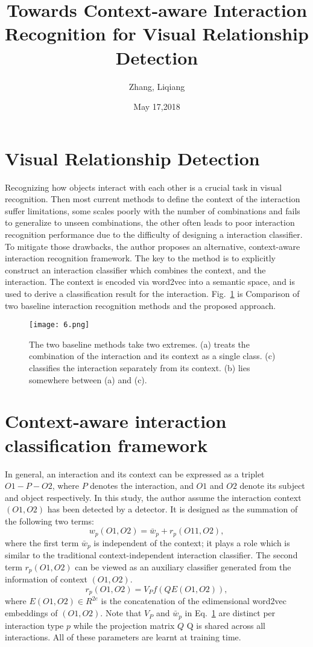 \documentclass{article}
\author{Zhang, Liqiang}
\date{May 17,2018}
\title{Towards Context-aware Interaction Recognition for Visual Relationship Detection}
\begin{document}
\maketitle
\par
\section{Visual Relationship Detection} 
Recognizing how objects interact with each other is a crucial task in visual recognition. Then most current methods to define the context of the interaction suffer limitations, some scales poorly with the number of combinations and fails to generalize to unseen combinations, the other often leads to poor interaction recognition performance due to the difficulty of designing a interaction classifier\cite{Liu2007Learning}. To mitigate those drawbacks, the author proposes an alternative, context-aware interaction recognition framework. The key to the method is to explicitly construct an interaction classifier which combines the context, and the interaction. The context is encoded via word2vec into a semantic space, and is used to derive a classification result for the interaction. Fig.~\ref{1} is Comparison of two baseline interaction recognition methods and the proposed approach.
\begin{figure}[H]
  \centering
  \texttt{[image: 6.png]}\\
  \caption{The two baseline methods take two extremes. (a) treats the combination of the interaction and its context as a single class. (c) classifies
the interaction separately from its context. (b) lies somewhere between (a) and (c).}\label{1}
\end{figure}
\section{Context-aware interaction classification framework} 
In general, an interaction and its context can be expressed as a triplet $O1-P-O2$, where $P$ denotes the interaction, and $O1$ and $O2$ denote its subject and object respectively. In this study, the author assume the interaction context $(O1,O2)$ has been detected by a detector. It is designed as the summation of the following two terms:
\begin{equation} \label{1}
w_p(O1,O2)=\bar{w}_p+r_p(O11,O2),
\end{equation}
where the first term $\bar{w}_p$ is independent of the context; it plays a role which is similar to the traditional context-independent interaction classifier. The second term $r_p(O1, O2) $ can be viewed as an auxiliary classifier generated from the information of context $(O1, O2)$.
\begin{equation} \label{1}
r_p(O1,O2)=V_Pf(QE(O1,O2)),
\end{equation}
where $E(O1,O2)\in R^{2e}$ is the concatenation of the edimensional word2vec embeddings of $(O1, O2)$. Note that $V_P$ and $\bar{w}_p$ in Eq.~\ref{1} are distinct per interaction type $p$ while the projection matrix $Q$ Q is shared across all interactions. All of these parameters are learnt at training time.
\end{document}
